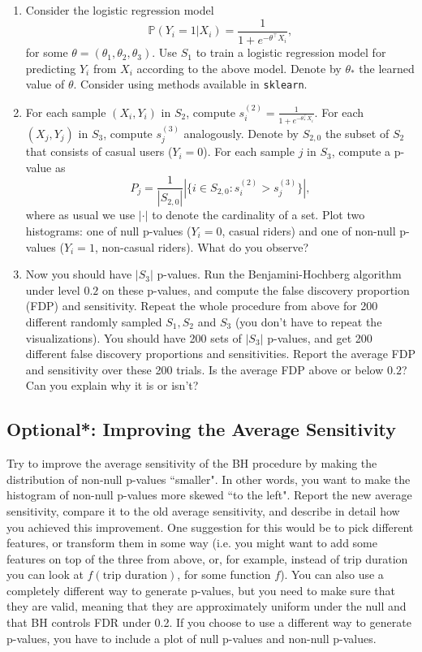 \documentclass[12pt, answers, addpoints]{exam}
\begin{document}
\begin{enumerate}
    \item Consider the logistic regression model 
$$\mathbb{P}(Y_i = 1 | X_i) = \frac{1}{1 + e^{-\theta^\top X_i}},$$
for some $\theta = (\theta_1,\theta_2,\theta_3)$. Use $S_1$ to train a logistic regression model for predicting $Y_i$ from $X_i$ according to the above model. Denote by $\theta_*$ the learned value of $\theta$. Consider using methods available in \texttt{sklearn}.
\item For each sample $(X_i,Y_i)$ in $S_2$, compute $s_i^{(2)} = \frac{1}{1 + e^{-\theta_*^\top X_i}}$. For each $(X_j,Y_j)$ in $S_3$, compute $s_j^{(3)}$ analogously. Denote by $S_{2,0}$ the subset of $S_2$ that consists of casual users ($Y_i = 0$). For each sample $j$ in $S_3$, compute a p-value as
$$P_j = \frac{1}{|S_{2,0}|} |\{i\in S_{2,0} : s_i^{(2)} > s_j^{(3)}\}|,$$
where as usual we use $|\cdot|$ to denote the cardinality of a set.
Plot two histograms: one of null p-values ($Y_i = 0$, casual riders) and one of non-null p-values ($Y_i = 1$, non-casual riders). What do you observe?
\item Now you should have $|S_3|$ p-values. Run the Benjamini-Hochberg algorithm under level $0.2$ on these p-values, and compute the false discovery proportion (FDP) and sensitivity. Repeat the whole procedure from above for 200 different randomly sampled $S_1,S_2$ and $S_3$ (you don't have to repeat the visualizations). You should have 200 sets of $|S_3|$ p-values, and get 200 different false discovery proportions and sensitivities. Report the average FDP and sensitivity over these 200 trials. Is the average FDP above or below $0.2$? Can you explain why it is or isn't?
\end{enumerate}

\subsection{Optional*: Improving the Average Sensitivity}

Try to improve the average sensitivity of the BH procedure by making the distribution of non-null p-values ``smaller". In other words, you want to make the histogram of non-null p-values more skewed ``to the left". Report the new average sensitivity, compare it to the old average sensitivity, and describe in detail how you achieved this improvement. One suggestion for this would be to pick different features, or transform them in some way (i.e. you might want to add some features on top of the three from above, or, for example, instead of trip duration you can look at $f(\text{trip duration})$, for some function $f$). You can also use a completely different way to generate p-values, but you need to make sure that they are valid, meaning that they are approximately uniform under the null and that BH controls FDR under 0.2. If you choose to use a different way to generate p-values, you have to include a plot of null p-values and non-null p-values.
\end{document}
